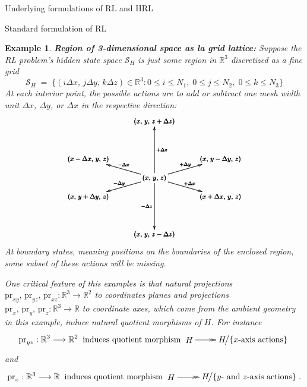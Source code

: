 \documentclass[11pt]{article}
\newtheorem{example}[subsubsection]{Example}
\begin{document}
\begin{section}{Underlying formulations of RL and HRL}
\begin{subsection}{Standard formulation of RL}
\begin{example}\label{ex: actions match projections}
{\bf Region of 3-dimensional space as la grid lattice:}
\normalfont
Suppose the RL problem's hidden state space $\mathcal{S}_{H}$ is just some region in $\mathbb{R}^{3}$ discretized as a fine grid
$$
\mathcal{S}_{H}
\;=\;
\Big\{(i\Delta x,\,j\Delta y,\,k\Delta z)\in\mathbb{R}^{3}:
0\le i\le N_1,\;
0\le j\le N_2,\;
0\le k\le N_3
\Big\}
$$
At each interior point, the possible actions are to add or subtract one mesh width unit $\Delta x$, $\Delta y$, or $\Delta x$ in the respective direction:
$$
\scalebox{.8}{$
\pmb{
\begin{xy}
(0,0)*+{(x,\,y,\,z)}="000";
(35,-10)*+{(x+\Delta x,\,y,\,z)}="100";
(-35,10)*+{(x-\Delta x,\,y,\,z)}="-100";
(35,10)*+{(x,\,y-\Delta y,\,z)}="010";
(-35,-10)*+{(x,\,y+\Delta y,\,z)}="0-10";
(0,30)*+{(x,\,y,\,z+\Delta z)}="001";
(0,-30)*+{(x,\,y,\,z-\Delta z)}="00-1";
{\ar^{+\Delta x} "000"; "100"};
{\ar^{+\Delta y} "000"; "010"};
{\ar_{+\Delta z} "000"; "001"};
{\ar_{-\Delta x} "000"; "-100"};
{\ar_{-\Delta y} "000"; "0-10"};
{\ar_{-\Delta z} "000"; "00-1"};
\end{xy}
}
$}
$$
At boundary states, meaning positions on the boundaries of the enclosed region, some subset of these actions will be missing.

One critical feature of this examples is that natural projections $\text{pr}_{xy},\,\text{pr}_{yz},\,\text{pr}_{xz}:\mathbb{R}^{3}\longrightarrow\mathbb{R}^{2}$ to coordinates planes and projections $\text{pr}_{x},\,\text{pr}_{y},\,\text{pr}_{z}:\mathbb{R}^{3}\longrightarrow\mathbb{R}$ to coordinate axes, which come from the ambient geometry in this example, induce natural quotient morphisms of $H$. For instance
$$
\text{pr}_{yz}:\mathbb{R}^{3}\longrightarrow\mathbb{R}^2
\;\;\text{induces quotient morphism}\;
\begin{xy}
(0,0)*+{H}="1";
(27,0)*+{H\!\big/\{x\text{-axis actions}\}}="2";
{\ar@{->>} "1"; "2"};
\end{xy}
$$
and
$$
\text{pr}_{x}:\mathbb{R}^{3}\longrightarrow\mathbb{R}
\;\;\text{induces quotient morphism}\;
\begin{xy}
(0,0)*+{H}="1";
(33,0)*+{H\!\big/\{y\text{- and }z\text{-axis actions}\}}="2";
{\ar@{->>} "1"; "2"};
\end{xy}.
$$
\end{example}



\end{subsection}
\end{section}
\end{document}
